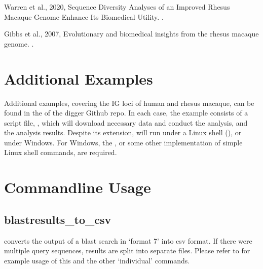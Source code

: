 \documentclass[letterpaper,10pt,english]{sphinxmanual}
\begin{document}
\sphinxAtStartPar
Warren et al., 2020, Sequence Diversity Analyses of an Improved Rhesus Macaque Genome Enhance Its Biomedical Utility.  .

\sphinxAtStartPar
Gibbs et al., 2007, Evolutionary and biomedical insights from the rhesus macaque genome.  .

\sphinxstepscope


\chapter{Additional Examples}
\label{\detokenize{examples/additional_examples:additional-examples}}\label{\detokenize{examples/additional_examples::doc}}
\sphinxAtStartPar
Additional examples, covering the IG loci of human and rhesus macaque, can be found in the  of the digger Github repo.
In each case, the example consists of a script file, , which will download necessary data and conduct the analysis, and the analysis results.
Despite its extension,  will run under a Linux shell (), or under Windows. For Windows, the
, or some other implementation of simple Linux shell commands, are required.

\sphinxstepscope


\chapter{Commandline Usage}
\label{\detokenize{usage:commandline-usage}}\label{\detokenize{usage:usage}}\label{\detokenize{usage::doc}}
\sphinxstepscope


\section{blastresults\_to\_csv}
\label{\detokenize{tools/blastresults_to_csv:blastresults-to-csv}}\label{\detokenize{tools/blastresults_to_csv:id1}}\label{\detokenize{tools/blastresults_to_csv::doc}}
\sphinxAtStartPar
{} converts the output of a blast search in ‘format 7’ into csv format. If there were multiple query sequences, results are split into separate files.
Please refer to  for example usage of this and the other ‘individual’ commands.
\end{document}
